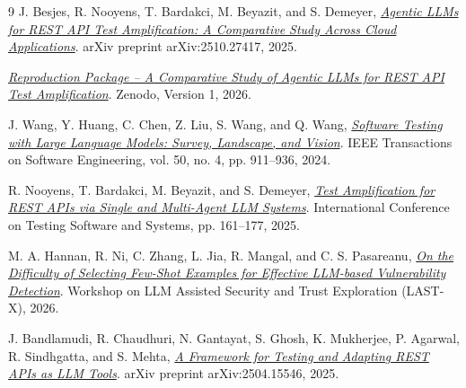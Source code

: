 \documentclass[12pt, a4paper]{article}
\begin{document}
\begin{thebibliography}{9}
J. Besjes, R. Nooyens, T. Bardakci, M. Beyazit, and S. Demeyer,
\href{https://arxiv.org/abs/2510.27417}
{\textit{Agentic LLMs for REST API Test Amplification:
A Comparative Study Across Cloud Applications}}.
arXiv preprint arXiv:2510.27417, 2025.

\href{https://doi.org/10.5281/zenodo.19251015}
{\textit{Reproduction Package -- A Comparative Study of Agentic LLMs
for REST API Test Amplification}}.
Zenodo, Version 1, 2026.

J. Wang, Y. Huang, C. Chen, Z. Liu, S. Wang, and Q. Wang,
\href{https://doi.org/10.1109/TSE.2024.3368208}
{\textit{Software Testing with Large Language Models:
Survey, Landscape, and Vision}}.
IEEE Transactions on Software Engineering,
vol. 50, no. 4, pp. 911--936, 2024.

R. Nooyens, T. Bardakci, M. Beyazit, and S. Demeyer,
\href{https://arxiv.org/abs/2504.08113}
{\textit{Test Amplification for REST APIs via Single and
Multi-Agent LLM Systems}}.
International Conference on Testing Software and Systems,
pp. 161--177, 2025.

M. A. Hannan, R. Ni, C. Zhang, L. Jia, R. Mangal, and C. S. Pasareanu,
\href{https://doi.org/10.14722/last-x.2026.23025}
{\textit{On the Difficulty of Selecting Few-Shot Examples for
Effective LLM-based Vulnerability Detection}}.
Workshop on LLM Assisted Security and Trust Exploration
(LAST-X), 2026.

J. Bandlamudi, R. Chaudhuri, N. Gantayat, S. Ghosh,
K. Mukherjee, P. Agarwal, R. Sindhgatta, and S. Mehta,
\href{https://arxiv.org/abs/2504.15546}
{\textit{A Framework for Testing and Adapting REST APIs as LLM Tools}}.
arXiv preprint arXiv:2504.15546, 2025.



\end{thebibliography}
\end{document}
